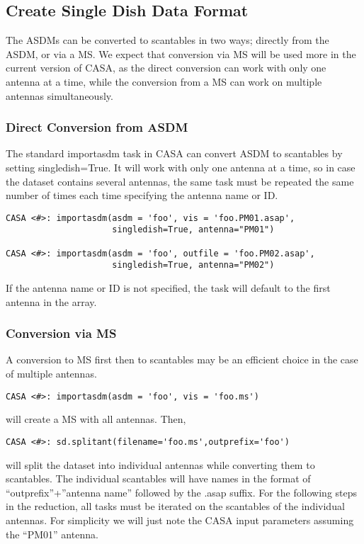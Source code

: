 \subsection{Create Single Dish Data Format}
\label{section:sd.sdguide.format}
The ASDMs can be converted to scantables in two ways; directly from the ASDM, or via a MS.  We expect that conversion via 
MS will be used more in the current version of CASA, as the direct conversion can work with only one antenna at a time,
while the conversion from a MS can work on multiple antennas simultaneously.  

\subsubsection{Direct Conversion from ASDM}
The standard importasdm task in CASA can convert ASDM to scantables by setting singledish=True.  It will work with only one 
antenna at a time, so in case the dataset contains several antennas, the same task must be repeated the same number of times 
each time specifying the antenna name or ID.

\begin{verbatim}
CASA <#>: importasdm(asdm = 'foo', vis = 'foo.PM01.asap', 
                     singledish=True, antenna="PM01")

CASA <#>: importasdm(asdm = 'foo', outfile = 'foo.PM02.asap', 
                     singledish=True, antenna="PM02")

\end{verbatim}
If the antenna name or ID is not specified, the task will default to the first antenna in the array.

\subsubsection{Conversion via MS}
A conversion to MS first then to scantables may be an efficient choice in the case of multiple antennas.
\begin{verbatim}
CASA <#>: importasdm(asdm = 'foo', vis = 'foo.ms')
\end{verbatim}
will create a MS with all antennas.  Then,
\begin{verbatim}
CASA <#>: sd.splitant(filename='foo.ms',outprefix='foo')
\end{verbatim}
will split the dataset into individual antennas while converting them
to scantables.  The individual scantables will have names in the
format of ``outprefix''+''antenna name'' followed by the .asap suffix.
For the following steps in the reduction, all tasks must be iterated
on the scantables of the individual antennas.  For simplicity we will
just note the CASA input parameters assuming the ``PM01'' antenna.

